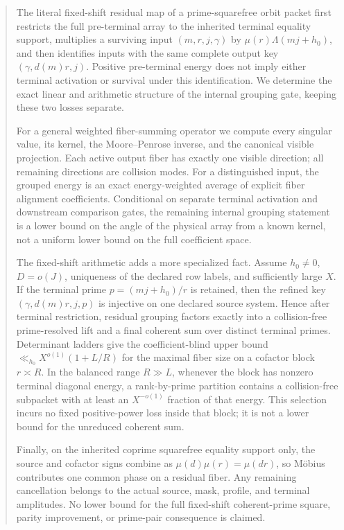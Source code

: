 \begin{abstract}
The literal fixed-shift residual map of a prime-squarefree orbit packet
first restricts the full pre-terminal array to the inherited terminal
equality support, multiplies a surviving input \((m,r,j,\gamma)\) by
\(\mu(r)\Lambda(mj+h_0)\), and then identifies inputs with the same
complete output key \((\gamma,d(m)r,j)\).  Positive pre-terminal energy
does not imply either terminal activation or survival under this
identification.  We determine the exact linear and arithmetic structure
of the internal grouping gate, keeping these two losses separate.

For a general weighted fiber-summing operator we compute every singular
value, its kernel, the Moore--Penrose inverse, and the canonical visible
projection.  Each active output fiber has exactly one visible direction;
all remaining directions are collision modes.  For a distinguished input,
the grouped energy is an exact energy-weighted average of explicit fiber
alignment coefficients.  Conditional on separate terminal activation and
downstream comparison gates, the remaining internal grouping statement is
a lower bound on the angle of the physical array from a known kernel, not
a uniform lower bound on the full coefficient space.

The fixed-shift arithmetic adds a more specialized fact.  Assume
\(h_0\ne0\), \(D=o(J)\), uniqueness of the declared row labels, and
sufficiently large \(X\).  If the terminal prime
\(p=(mj+h_0)/r\) is retained, then the refined key
\((\gamma,d(m)r,j,p)\) is injective on one declared source system.  Hence
after terminal restriction, residual grouping factors exactly into a
collision-free prime-resolved lift
and a final coherent sum over distinct terminal primes.  Determinant
ladders give the coefficient-blind upper bound
\(\ll_{h_0}X^{o(1)}(1+L/R)\) for the maximal fiber size on a cofactor block
\(r\asymp R\).  In the balanced range \(R\gg L\), whenever the block has
nonzero terminal diagonal energy, a rank-by-prime partition contains a
collision-free subpacket with at least an \(X^{-o(1)}\) fraction of that
energy.  This selection incurs no fixed positive-power loss inside that
block; it is not a lower bound for the unreduced coherent sum.

Finally, on the inherited coprime squarefree equality support only, the
source and cofactor signs combine as
\(\mu(d)\mu(r)=\mu(d r)\), so M\"obius contributes one common phase on a
residual fiber.  Any remaining cancellation belongs to the actual source,
mask, profile, and terminal amplitudes.  No lower bound for the full
fixed-shift coherent-prime square, parity improvement, or prime-pair
consequence is claimed.
\end{abstract}
